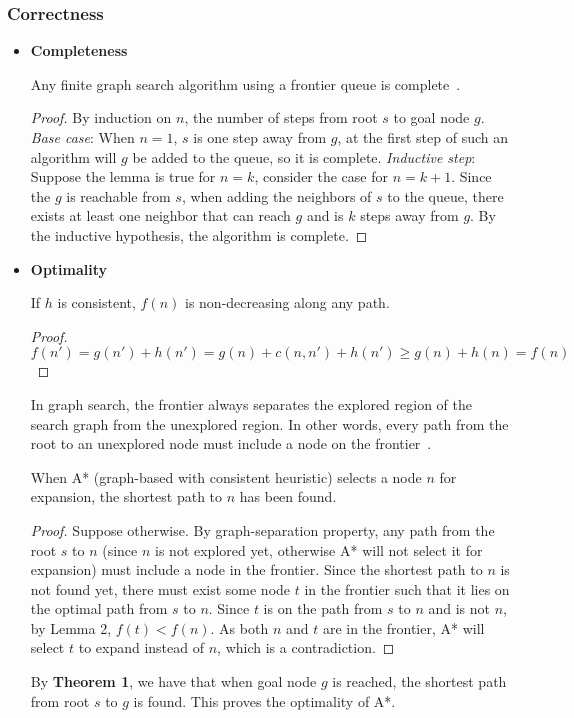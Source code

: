 \documentclass{llncs}
\begin{document}
\subsubsection{Correctness}
\begin{itemize}
	\item[] \textbf{Completeness}
	\begin{lemma} 
	Any finite graph search algorithm using a frontier queue is complete~\cite{sertac}.
	\end{lemma} 
	\begin{proof} 
	By induction on $n$, the number of steps from root $s$ to goal node $g$. \emph{Base case}: When $n=1$, $s$ is one step away from $g$, at the first step of such an algorithm will $g$ be added to the queue, so it is complete. \emph{Inductive step}: Suppose the lemma is true for $n=k$, consider the case for $n=k+1$. Since the $g$ is reachable from $s$, when adding the neighbors of $s$ to the queue, there exists at least one neighbor that can reach $g$ and is $k$ steps away from $g$. By the inductive hypothesis, the algorithm is complete. 
	\end{proof}
	\item[] \textbf{Optimality}
	\begin{lemma} 
	If $h$ is consistent, $f(n)$ is non-decreasing along any path.
	\end{lemma}
	\begin{proof}
	$f(n')=g(n')+h(n')=g(n)+c(n,n')+h(n') \geq g(n)+h(n)=f(n)$ 
	\end{proof}
	\begin{lemma}  In graph search, the frontier always separates the explored region of the search graph from the unexplored region. In other words, every path from the root to an unexplored node must include a node on the frontier~\cite{aima}. 
	\end{lemma}
	\begin{theorem}
	When A* (graph-based with consistent heuristic) selects a node $n$ for expansion, the shortest path to $n$ has been found. 
	\end{theorem}
	\begin{proof}
	Suppose otherwise. By graph-separation property, any path from the root $s$ to $n$ (since $n$ is not explored yet, otherwise A* will not select it for expansion) must include a node in the frontier. Since the shortest path to $n$ is not found yet, there must exist some node $t$ in the frontier such that it lies on the optimal path from $s$ to $n$. Since $t$ is on the path from $s$ to $n$ and is not $n$, by Lemma 2, $f(t)<f(n)$. As both $n$ and $t$ are in the frontier, A* will select $t$ to expand instead of $n$, which is a contradiction.
	\end{proof}
	By \textbf{Theorem 1}, we have that when goal node $g$ is reached, the shortest path from root $s$ to $g$ is found. This proves the optimality of A*.
\end{itemize}
\end{document}
